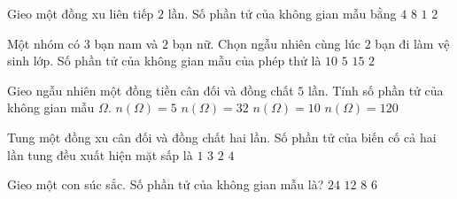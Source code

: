 

\begin{ex}%
	 Gieo một đồng xu liên tiếp $2$ lần. Số phần tử của không gian mẫu bằng
	 \choice
		 {\True $4$}
		 {$8$}
		 {$1$}
		{$2$} 
\end{ex}

\begin{ex}%
	Một nhóm có $3$ bạn nam và $2$ bạn nữ. Chọn ngẫu nhiên cùng lúc $2$ bạn đi làm vệ sinh lớp. Số phần tử của không gian mẫu của phép thử  là
	 \choice
		 {\True $10$}
		{$5$} 
		{$15$} 
		{$2$} 
\end{ex}

\begin{ex}%
	Gieo ngẫu nhiên  một đồng tiền cân đối và đồng chất $5$ lần. Tính số phần tử của không gian mẫu $\Omega$.
	 \choice
		 {$n(\Omega)=5$}
		 {\True $n(\Omega)=32$}
		 {$n(\Omega)=10$}
		{$n(\Omega)=120$} 
\end{ex}

\begin{ex}%
	Tung một đồng xu cân đối và đồng  chất hai lần. Số phần tử của biến cố cả hai lần tung đều xuất hiện mặt sấp là
	 \choice
		 {\True $1$}
		 {$3$}
		 {$2$}
		 {$4$}
\end{ex}

\begin{ex}%
	Gieo một con súc sắc. Số phần tử  của không gian mẫu là?
	\choice 
		 {$24$}
		 {$12$}
		 {$8$}
		{\True  $6$}
\end{ex}

